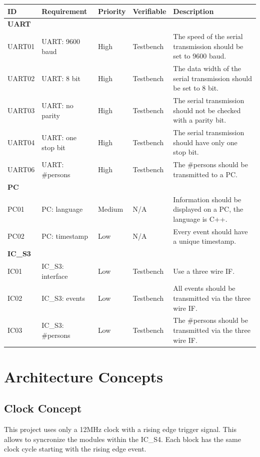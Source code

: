 \documentclass[12pt,a4 paper] {report}
\begin{document}
\begin{center}
	\begin{tabular}{|p{1.5cm}|p{3.5cm}|p{1.5cm}|p{2cm}|p{5.5cm}|}
		\hline
		\textbf{ID} & \textbf{Requirement} & \textbf{Priority} & \textbf{Verifiable} & \textbf{Description} \\
		\hline
		\multicolumn{5}{|l|}{\textbf{UART}} \\
		\hline
		UART01 & UART: 9600 baud & High &  Testbench & The speed of the serial transmission should be set to 9600 baud. \\
		\hline
		UART02 & UART: 8 bit & High & Testbench & The data width of the serial transmission should be set to 8 bit. \\
		\hline
		UART03 & UART: no parity & High & Testbench & The serial transmission should not be checked with a parity bit. \\
		\hline
		UART04 & UART: one stop bit & High  & Testbench & The serial transmission should have only one stop bit. \\
		\hline
		UART06 & UART: \#persons & High &  Testbench &  The \#persons should be transmitted to a PC. \\
		\hline
		\multicolumn{5}{|l|}{\textbf{PC}} \\
		\hline	
		PC01 & PC: language & Medium & N/A &  Information should be displayed on a PC, the language is C++. \\
		\hline
		PC02 & PC: timestamp & Low & N/A  & Every event should have a unique timestamp. \\
		\hline
		\multicolumn{5}{|l|}{\textbf{IC\_S3}} \\
		\hline
		IC01 & IC\_S3: interface & Low & Testbench & Use a three wire IF. \\
		\hline
		IC02 & IC\_S3: events & Low & Testbench & All events should be transmitted via the three wire IF. \\
		\hline
		IC03 & IC\_S3: \#persons & Low  & Testbench & The \#persons should be transmitted via the three wire IF. \\
		\hline
	\end{tabular}
\end{center}

\newpage

\chapter{Architecture Concepts}
\section*{Clock Concept}
This project uses only a 12MHz clock with a rising edge trigger signal. This allows to syncronize the modules within the IC\_S4.
Each block has the same clock cycle starting with the rising edge event.
\end{document}
